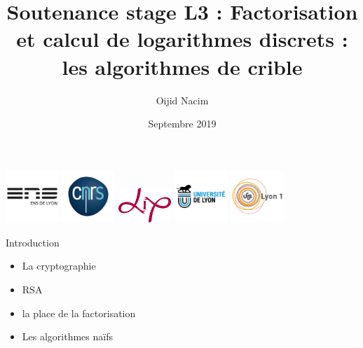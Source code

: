 \documentclass{beamer}
\title{Soutenance stage L3 : Factorisation et calcul de logarithmes discrets : les algorithmes de crible}
\author{Oijid Nacim}
\institute{}
\date{Septembre 2019}
\begin{document}
\begin{titlepage}
\vfill
 \begin{center}
  \includegraphics[width = 20mm]{ENS_Lyon.png} \hfill
  \includegraphics[width = 20mm]{cnrs.jpg} \hfill
  \includegraphics[width = 20mm]{LIP.png}\hfill
  \includegraphics[width = 20mm]{univ_lyon.jpg} \hfill
  \includegraphics[width = 20mm]{ucbl.jpg}

\end{center}
\end{titlepage}

\begin{frame}{Introduction}
  

  \begin{itemize}
  
\item<1,2,3,4> La cryptographie

 \item<2,3,4> RSA
  
  \item< 3,4> la place de la factorisation

 \item<4> Les algorithmes naïfs

  \end{itemize}
  
\end{frame}
\end{document}
